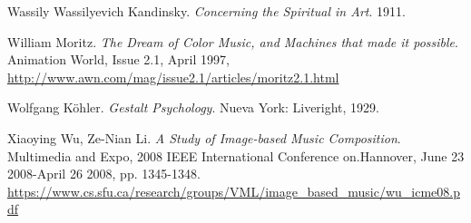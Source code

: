 \begin{thebibliography}{9}
 Wassily Wassilyevich Kandinsky. \emph{Concerning the Spiritual in Art}. 1911.

 William Moritz. \emph{The Dream of Color Music, and Machines that made it possible}. Animation World, Issue 2.1, April 1997,\\ 
 \url{http://www.awn.com/mag/issue2.1/articles/moritz2.1.html}

 Wolfgang Köhler. \emph{Gestalt Psychology}. Nueva York: Liveright, 1929.

 Xiaoying Wu, Ze-Nian Li. \emph{A Study of Image-based Music Composition}. Multimedia and Expo, 2008 IEEE International Conference on.Hannover, June 23 2008-April 26 2008, pp. 1345-1348.\\
 \url{https://www.cs.sfu.ca/research/groups/VML/image_based_music/wu_icme08.pdf}
\end{thebibliography}